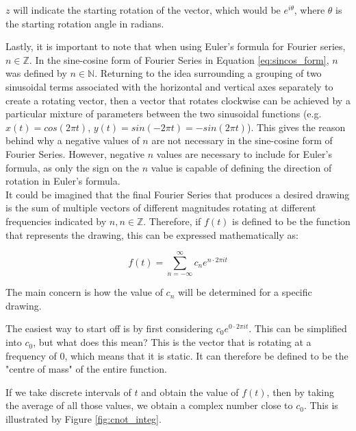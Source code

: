 \documentclass[letterpaper, 12pt]{article}
\begin{document}
\(z\) will indicate the starting rotation of the vector, which would be
\(e^{i\theta}\), where \(\theta\) is the starting rotation angle in radians.

Lastly, it is important to note that when using Euler's formula for
Fourier series, \(n \in \mathbb{Z}\).
In the sine-cosine form of Fourier Series in Equation \ref*{eq:sincos_form},
\(n\) was defined by \(n \in \mathbb{N}\).
Returning to the idea surrounding a grouping of two sinusoidal terms
associated with the horizontal and vertical axes separately to create
a rotating vector,
then a vector that rotates clockwise can be achieved
by a particular mixture of parameters between the two
sinusoidal functions (e.g. \(x(t) = cos(2\pi t)\), \(y(t) = sin(-2\pi t) = -sin(2\pi t)\)).
This gives the reason behind why a negative values of \(n\) are not
necessary in the sine-cosine form of Fourier Series. However,
negative \(n\) values are necessary to include for Euler's formula,
as only the sign on the \(n\) value is capable of defining the direction
of rotation in Euler's formula.
\\

It could be imagined that the final Fourier Series that produces a desired drawing
is the sum of multiple vectors of different magnitudes rotating at different frequencies
indicated by \(n, n \in \mathbb{Z}\). Therefore, if \(f(t)\) is defined to be the
function that represents the drawing, this can be expressed mathematically
as:

\begin{equation}
    f(t) = \sum_{n=-\infty}^{\infty} c_n e^{n \cdot 2\pi it}
    \label{eq:ft_def}
\end{equation}

The main concern is how the value of \(c_n\) will be determined
for a specific drawing.

The easiest way to start off is by first considering \(c_0 e^{0 \cdot 2\pi it}\).
This can be simplified into \(c_0\), but what does this mean?
This is the vector that is rotating at a frequency of 0, which means that
it is static. It can therefore be defined to be the "centre of mass"\cite{sandersonWhatFourierSeries2019}
of the entire function.

If we take discrete intervals of \(t\) and obtain the value of \(f(t)\),
then by taking the average of all those values, we obtain a complex number
close to \(c_0\). This is illustrated by Figure \ref{fig:cnot_integ}.
\end{document}

